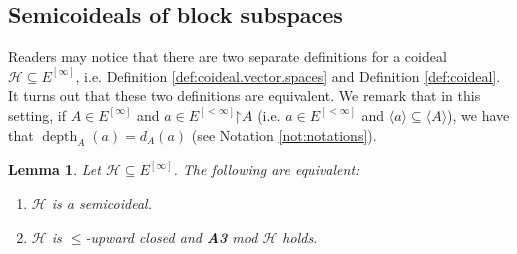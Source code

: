 \documentclass[10pt,a4paper]{amsart}
\theoremstyle{plain}
\numberwithin{equation}{section}
\newtheorem{lemma}[theorem]{Lemma}
\theoremstyle{definition}
\newcommand{\func}{\operatorname}
\renewcommand{\c}[1]{\langle #1 \rangle}
\newcommand{\cal}{\mathcal}
\newcommand{\restrictedto}{\mathord{\upharpoonright}}
\renewcommand{\H}{\cal{H}}
\newcommand{\depth}{\func{depth}}
\begin{document}
\subsection{Semicoideals of block subspaces}
Readers may notice that there are two separate definitions for a coideal $\H \subseteq E^{[\infty]}$, i.e. Definition \ref{def:coideal.vector.spaces} and Definition \ref{def:coideal}. It turns out that these two definitions are equivalent. We remark that in this setting, if $A \in E^{[\infty]}$ and $a \in E^{[<\infty]}\restrictedto A$ (i.e. $a \in E^{[<\infty]}$ and $\c{a} \subseteq \c{A}$), we have that $\depth_A(a) = d_A(a)$ (see Notation \ref{not:notations}).

\begin{lemma}
    Let $\H \subseteq E^{[\infty]}$. The following are equivalent:
    \begin{enumerate}
        \item $\H$ is a semicoideal.
        
        \item $\H$ is $\leq$-upward closed and \textbf{A3} mod $\H$ holds.
    \end{enumerate}
\end{lemma}
\end{document}

